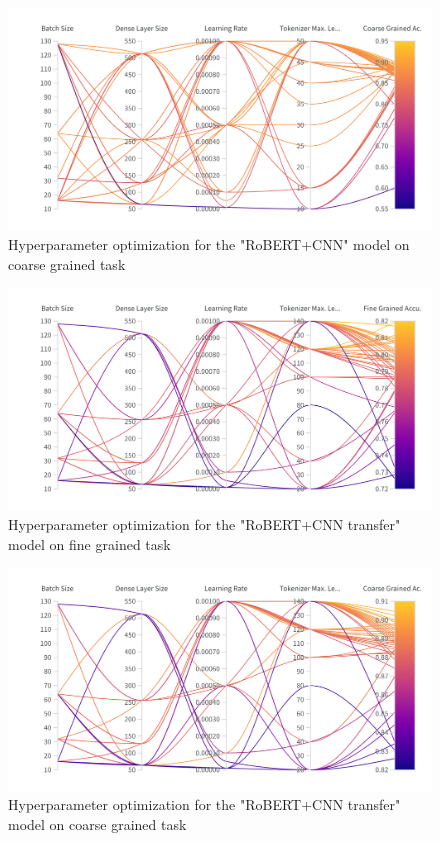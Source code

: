 \documentclass[12pt,a4paper]{report}
\begin{document}
\begin{figure}[H]
\centering
\includegraphics[width=16cm]{pics/cg-wandb-BERT-CNN-FBRO.png}
  \caption{Hyperparameter optimization for the "RoBERT+CNN" model on coarse grained task}
  \label{fig:HO-BERT-CNN-FBRO-CG}
\end{figure}

\begin{figure}[H]
\centering
\includegraphics[width=16cm]{pics/fg-wandb-BERT-CNN-TRANSF.png}
  \caption{Hyperparameter optimization for the "RoBERT+CNN transfer" model on fine grained task}
  \label{fig:HO-BERT-CNN-TRANSF}
\end{figure}

\begin{figure}[H]
\centering
\includegraphics[width=16cm]{pics/cg-wandb-BERT-CNN-TRANSF.png}
  \caption{Hyperparameter optimization for the "RoBERT+CNN transfer" model on coarse grained task}
  \label{fig:HO-BERT-CNN-TRANSF-CG}
\end{figure}
\end{document}

